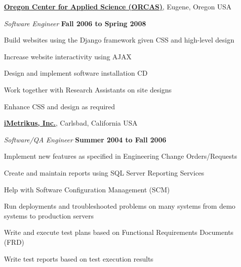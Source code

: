 \documentclass[11pt]{article}
\newenvironment{outerlist}[1][\enskip\textbullet]%
        {\begin{itemize}[#1]}{\end{itemize}%
         \vspace{-.6\baselineskip}}
\newenvironment{innerlist}[1][\enskip\textbullet]%
        {\begin{compactitem}[#1]}{\end{compactitem}}
\newcommand{\blankline}{\quad\pagebreak[2]}
\begin{document}
\href{http://www.orcasinc.com/}{\textbf{Oregon Center for Applied Science (ORCAS)}},
Eugene, Oregon USA
\begin{outerlist}

    \item[] \textit{Software Engineer}%
            \hfill \textbf{Fall 2006 to Spring 2008}
    \begin{innerlist}
         \item Build websites using the Django framework given CSS and high-level design
         \item Increase website interactivity using AJAX
         \item Design and implement software installation CD
         \item Work together with Research Assistants on site designs
         \item Enhance CSS and design as required
    \end{innerlist}
\end{outerlist}

\blankline

\href{http://www.imetrikus.com/}{\textbf{iMetrikus, Inc.}},
Carlsbad, California USA
\begin{outerlist}

    \item[] \textit{Software/QA Engineer}%
            \hfill \textbf{Summer 2004 to Fall 2006}
    \begin{innerlist}
		\item Implement new features as specified in Engineering Change Orders/Requests
		\item Create and maintain reports using SQL Server Reporting Services
		\item Help with Software Configuration Management (SCM)
		\item Run deployments and troubleshooted problems on many systems from demo systems to production servers
		\item Write and execute test plans based on Functional Requirements Documents (FRD)
		\item Write test reports based on test execution results
    \end{innerlist}

\end{outerlist}
\end{document}
